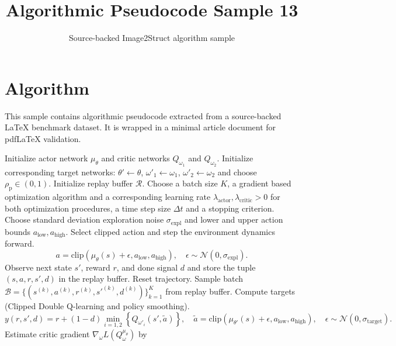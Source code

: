 \documentclass[11pt]{article}
\title{Algorithmic Pseudocode Sample 13}
\author{Source-backed Image2Struct algorithm sample}
\date{}
\begin{document}
\maketitle
\section{Algorithm}
This sample contains algorithmic pseudocode extracted from a source-backed LaTeX benchmark dataset. It is wrapped in a minimal article document for pdfLaTeX validation.

\begin{algorithm}[htbp]
\caption{Source-backed algorithmic procedure}
\begin{algorithmic}[1]
\State Initialize actor network $\mu_\theta$ and critic networks $Q_{\omega_1}$ and $Q_{\omega_2}$.
\State Initialize corresponding target networks: $\theta' \leftarrow \theta$, ${\omega'}_1 \leftarrow \omega_1$, ${\omega'}_2 \leftarrow \omega_2$ and choose $\rho_\text{p} \in (0, 1)$.
\State Initialize replay buffer $\mathcal{R}$.
\State Choose a batch size $K$, a gradient based optimization algorithm and a corresponding learning rate $\lambda_\text{actor}, \lambda_\text{critic} > 0$ for both optimization procedures, a time step size $\Delta t$ and a stopping criterion.
\State Choose standard deviation exploration noise $\sigma_\text{expl}$ and lower and upper action bounds $a_\text{low}, a_\text{high}$.
\Repeat
\State Select clipped action and step the environment dynamics forward.
\begin{equation*}
a= \text{clip}(\mu_\theta(s) + \epsilon, a_\text{low}, a_\text{high}), \quad \epsilon \sim \mathcal{N}(0, \sigma_\text{expl}).
\end{equation*}
\State Observe next state $s'$, reward $r$, and done signal $d$ and store the tuple $(s, a, r, s', d)$ in the replay buffer.
\State Reset trajectory.
\EndIf
{}
\State Sample batch $\mathcal{B} = \{(s^{(k)}, a^{(k)}, r^{(k)}, {s'}^{(k)}, d^{(k)})\}_{k=1}^K$ from replay buffer.
\State Compute targets (Clipped Double Q-learning and policy smoothing).
\begin{equation*}
y(r, s', d) = r + (1-d) \min\limits_{i=1, 2} \left\{ Q_{{\omega'}_i}(s', \tilde{a}) \right\}, \quad \tilde{a}= \text{clip}(\mu_{\theta'}(s) + \epsilon, a_\text{low}, a_\text{high}), \quad \epsilon \sim \mathcal{N}(0, \sigma_\text{target}).
\end{equation*}
\State Estimate critic gradient $\nabla_\omega L(Q_\omega^{\mu_\theta})$ by

\end{algorithmic}
\end{algorithm}
\end{document}
